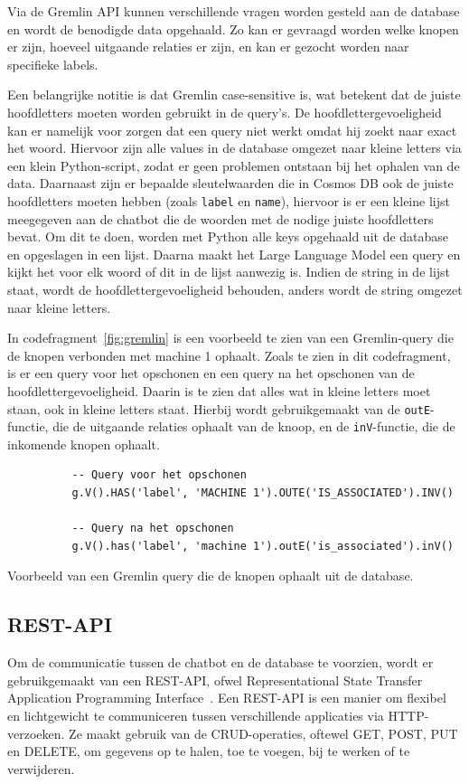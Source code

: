 Via de Gremlin API kunnen verschillende vragen worden gesteld aan de database en wordt de benodigde data opgehaald. 
Zo kan er gevraagd worden welke knopen er zijn, hoeveel uitgaande relaties er zijn, en kan er gezocht worden naar specifieke labels.

Een belangrijke notitie is dat Gremlin case-sensitive is, wat betekent dat de juiste hoofdletters moeten worden gebruikt in de query's.
De hoofdlettergevoeligheid kan er namelijk voor zorgen dat een query niet werkt omdat hij zoekt naar exact het woord.
Hiervoor zijn alle values in de database omgezet naar kleine letters via een klein Python-script, zodat er geen problemen ontstaan bij het ophalen van de data.
Daarnaast zijn er bepaalde sleutelwaarden die in Cosmos DB ook de juiste hoofdletters moeten hebben (zoals \texttt{label} en \texttt{name}), hiervoor is er een kleine lijst meegegeven aan de chatbot die de woorden met de nodige juiste hoofdletters bevat.
Om dit te doen, worden met Python alle keys opgehaald uit de database en opgeslagen in een lijst. Daarna maakt het Large Language Model een query en kijkt het voor elk woord of dit in de lijst aanwezig is.
Indien de string in de lijst staat, wordt de hoofdlettergevoeligheid behouden, anders wordt de string omgezet naar kleine letters.

In codefragment~\ref{fig:gremlin} is een voorbeeld te zien van een Gremlin-query die de knopen verbonden met machine 1 ophaalt.
Zoals te zien in dit codefragment, is er een query voor het opschonen en een query na het opschonen van de hoofdlettergevoeligheid. 
Daarin is te zien dat alles wat in kleine letters moet staan, ook in kleine letters staat.
Hierbij wordt gebruikgemaakt van de \texttt{outE}-functie, die de uitgaande relaties ophaalt van de knoop, en de \texttt{inV}-functie, die de inkomende knopen ophaalt.

\begin{listing} [H]
     \begin{verbatim}
          -- Query voor het opschonen
          g.V().HAS('label', 'MACHINE 1').OUTE('IS_ASSOCIATED').INV()

          -- Query na het opschonen
          g.V().has('label', 'machine 1').outE('is_associated').inV()
     \end{verbatim}
     \caption[Voorbeeld Gremlin query]{\label{fig:gremlin}Voorbeeld van een Gremlin query die de knopen ophaalt uit de database.}
\end{listing}

\subsection{REST-API}{\label{sec:restapi}}
Om de communicatie tussen de chatbot en de database te voorzien, wordt er gebruikgemaakt van een REST-API, ofwel Representational State Transfer Application Programming Interface~\autocite{RESTAPI2021}.
Een REST-API is een manier om flexibel en lichtgewicht te communiceren tussen verschillende applicaties via HTTP-verzoeken.
Ze maakt gebruik van de CRUD-operaties, oftewel GET, POST, PUT en DELETE, om gegevens op te halen, toe te voegen, bij te werken of te verwijderen.

